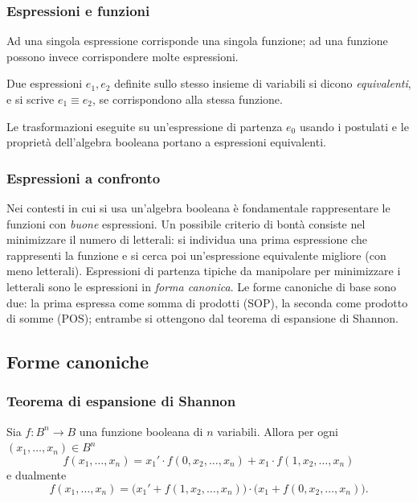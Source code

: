 \documentclass[11pt,a4paper]{article}
\begin{document}
\subsubsection{Espressioni e funzioni}

Ad una singola espressione corrisponde una singola funzione; ad una funzione
possono invece corrispondere molte espressioni.

\begin{definizione}
Due espressioni $e_1, e_2$ definite sullo stesso insieme di variabili si dicono
\emph{equivalenti}, e si scrive $e_1 \equiv e_2$, se corrispondono alla stessa
funzione.
\end{definizione}

Le trasformazioni eseguite su un'espressione di partenza $e_0$ usando i
postulati e le proprietà dell'algebra booleana portano a espressioni
equivalenti.

\subsubsection{Espressioni a confronto}

Nei contesti in cui si usa un'algebra booleana è fondamentale rappresentare le
funzioni con \emph{buone} espressioni. Un possibile criterio di bontà consiste
nel minimizzare il numero di letterali: si individua una prima espressione che
rappresenti la funzione e si cerca poi un'espressione equivalente migliore (con
meno letterali). Espressioni di partenza tipiche da manipolare per minimizzare i
letterali sono le espressioni in \emph{forma canonica}. Le forme canoniche di
base sono due: la prima espressa come somma di prodotti (SOP), la seconda come
prodotto di somme (POS); entrambe si ottengono dal teorema di espansione di
Shannon.

\subsection{Forme canoniche}

\subsubsection{Teorema di espansione di Shannon}

\begin{teorema}
Sia $f \colon B^n \to B$ una funzione booleana di $n$ variabili. Allora per
ogni $(x_1, \dots, x_n) \in B^n$
\[
  f(x_1, \dots, x_n) = x_1' \cdot f(0, x_2, \dots, x_n)
                     + x_1 \cdot f(1, x_2, \dots, x_n)
\]
e dualmente
\[
  f(x_1, \dots, x_n) = \bigl(x_1' + f(1, x_2, \dots, x_n)\bigr)
                       \cdot \bigl(x_1 + f(0, x_2, \dots, x_n)\bigr).
\]
\end{teorema}
\end{document}
